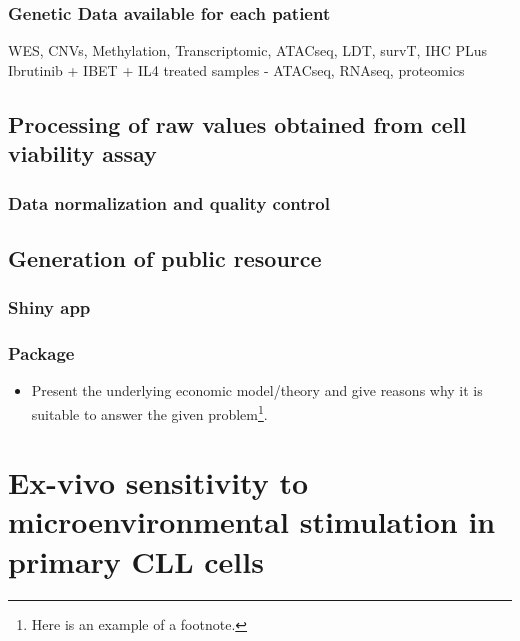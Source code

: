 \documentclass[11pt, a4paper, twosided]{book}
\providecommand{\tightlist}{%
  \setlength{\itemsep}{0pt}\setlength{\parskip}{0pt}}
\begin{document}
\hypertarget{genetic-data-available-for-each-patient}{%
\subsection{Genetic Data available for each patient}\label{genetic-data-available-for-each-patient}}

WES, CNVs, Methylation, Transcriptomic, ATACseq, LDT, survT, IHC
PLus Ibrutinib + IBET + IL4 treated samples - ATACseq, RNAseq, proteomics

\hypertarget{processing-of-raw-values-obtained-from-cell-viability-assay}{%
\section{Processing of raw values obtained from cell viability assay}\label{processing-of-raw-values-obtained-from-cell-viability-assay}}

\hypertarget{data-normalization-and-quality-control}{%
\subsection{Data normalization and quality control}\label{data-normalization-and-quality-control}}

\hypertarget{generation-of-public-resource}{%
\section{Generation of public resource}\label{generation-of-public-resource}}

\hypertarget{shiny-app}{%
\subsection{Shiny app}\label{shiny-app}}

\hypertarget{package}{%
\subsection{Package}\label{package}}
\begin{itemize}
\tightlist
\item
  Present the underlying economic model/theory and give reasons why it is
  suitable to answer the given problem\footnote{Here is an example of a footnote.}.
\end{itemize}
\hypertarget{ex-vivo-sensitivity-to-microenvironmental-stimulation-in-primary-cll-cells}{%
\chapter{Ex-vivo sensitivity to microenvironmental stimulation in primary CLL cells}\label{ex-vivo-sensitivity-to-microenvironmental-stimulation-in-primary-cll-cells}}
\end{document}
